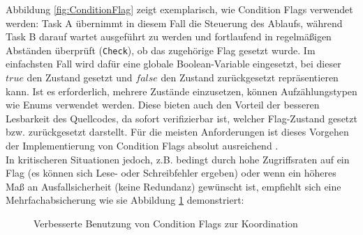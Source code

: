 \documentclass{llncs}
\begin{document}
Abbildung \ref{fig:ConditionFlag} zeigt exemplarisch, wie Condition Flags verwendet werden: Task A übernimmt in diesem Fall die Steuerung des Ablaufs, während Task B darauf wartet ausgeführt zu werden und fortlaufend in regelmäßigen Abständen überprüft (\texttt{Check}), ob das zugehörige Flag gesetzt wurde. Im einfachsten Fall wird dafür eine globale Boolean-Variable eingesetzt, bei dieser $true$ den Zustand \glq gesetzt\grq{} und $false$ den Zustand \glq zurückgesetzt\grq{} repräsentieren kann. Ist es erforderlich, mehrere Zustände einzusetzen, können Aufzählungstypen wie Enums verwendet werden. Diese bieten auch den Vorteil der besseren Lesbarkeit des Quellcodes, da sofort verifizierbar ist, welcher Flag-Zustand \glq gesetzt\grq{} bzw. \glq zurückgesetzt\grq{} darstellt. Für die meisten Anforderungen ist dieses Vorgehen der Implementierung von Condition Flags absolut ausreichend \autocite[vgl.][84]{Cooling2017}.\\

In kritischeren Situationen jedoch, z.B. bedingt durch hohe Zugriffsraten auf ein Flag (es können sich Lese- oder Schreibfehler ergeben) oder wenn ein höheres Maß an Ausfallsicherheit (keine Redundanz) gewünscht ist, empfiehlt sich eine Mehrfachabsicherung wie sie Abbildung \ref{fig:ConditionFlag2} demonstriert:

\begin{figure} [h]
	\centering
	\def\svgwidth{300pt}
	
	\caption{\label{fig:ConditionFlag2} Verbesserte Benutzung von Condition Flags zur Koordination \autocite[vgl.][84]{Cooling2017}}
\end{figure}
\end{document}
